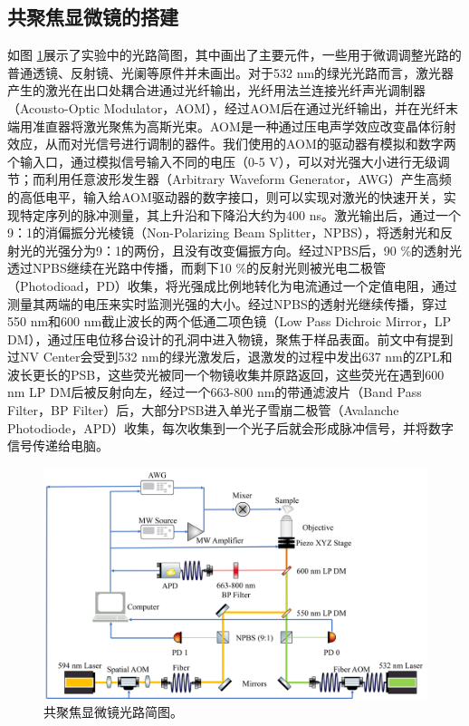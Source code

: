 \documentclass[type = bachelor]{whu-thesis}
\begin{document}
\subsection{共聚焦显微镜的搭建}
如图 \ref{fig: Light Path}展示了实验中的光路简图，其中画出了主要元件，一些用于微调调整光路的普通透镜、反射镜、光阑等原件并未画出。对于532 nm的绿光光路而言，激光器产生的激光在出口处耦合进通过光纤输出，光纤用法兰连接光纤声光调制器（Acousto-Optic Modulator，AOM），经过AOM后在通过光纤输出，并在光纤末端用准直器将激光聚焦为高斯光束。AOM是一种通过压电声学效应改变晶体衍射效应，从而对光信号进行调制的器件。我们使用的AOM的驱动器有模拟和数字两个输入口，通过模拟信号输入不同的电压（0-5 V），可以对光强大小进行无级调节；而利用任意波形发生器（Arbitrary Waveform Generator，AWG）产生高频的高低电平，输入给AOM驱动器的数字接口，则可以实现对激光的快速开关，实现特定序列的脉冲测量，其上升沿和下降沿大约为400 ns。激光输出后，通过一个9：1的消偏振分光棱镜（Non-Polarizing Beam Splitter，NPBS），将透射光和反射光的光强分为9：1的两份，且没有改变偏振方向。经过NPBS后，90 \%的透射光透过NPBS继续在光路中传播，而剩下10 \%的反射光则被光电二极管（Photodioad，PD）收集，将光强成比例地转化为电流通过一个定值电阻，通过测量其两端的电压来实时监测光强的大小。经过NPBS的透射光继续传播，穿过550 nm和600 nm截止波长的两个低通二项色镜（Low Pass Dichroic Mirror，LP DM），通过压电位移台设计的孔洞中进入物镜，聚焦于样品表面。前文中有提到过NV Center会受到532 nm的绿光激发后，退激发的过程中发出637 nm的ZPL和波长更长的PSB，这些荧光被同一个物镜收集并原路返回，这些荧光在遇到600 nm LP DM后被反射向左，经过一个663-800 nm的带通滤波片（Band Pass Filter，BP Filter）后，大部分PSB进入单光子雪崩二极管（Avalanche Photodiode，APD）收集，每次收集到一个光子后就会形成脉冲信号，并将数字信号传递给电脑。
\begin{figure}
  \centering
  \includegraphics[width=1.0\textwidth]{figures/Chapter 1/Light Path.png}
  \caption[共聚焦显微镜光路简图]{共聚焦显微镜光路简图。}
  \label{fig: Light Path}
\end{figure}
\end{document}
